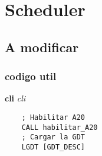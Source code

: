 
\section{Scheduler}
\subsection{A modificar}
\subsubsection{codigo util}
\textbf{cli} \textit{cli}

\begin{codesnippet}
\begin{verbatim}
    ; Habilitar A20
    CALL habilitar_A20
    ; Cargar la GDT
    LGDT [GDT_DESC]
\end{verbatim}
\end{codesnippet}
